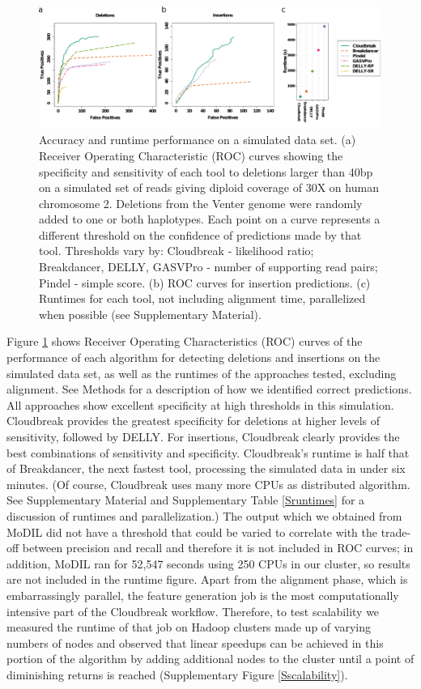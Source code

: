 \documentclass[11pt]{article}
\begin{document}
\begin{figure}
\centering
\includegraphics[width=1\textwidth]{../figures/chr2_sim_rocs_runtime.pdf}
\caption{Accuracy and runtime performance on a simulated data set. (a) Receiver Operating Characteristic (ROC) curves showing the specificity and sensitivity of each tool to deletions larger than 40bp on a simulated set of reads giving diploid coverage of 30X on human chromosome 2. Deletions from the Venter genome were randomly added to one or both haplotypes. Each point on a curve represents a different threshold on the confidence of predictions made by that tool. Thresholds vary by: Cloudbreak - likelihood ratio; Breakdancer, DELLY, GASVPro - number of supporting read pairs; Pindel - simple score. (b) ROC curves for insertion predictions. (c) Runtimes for each tool, not including alignment time, parallelized when possible (see Supplementary Material).}
\label{chr2CombinedRoc}
\end{figure}

Figure \ref{chr2CombinedRoc} shows Receiver Operating Characteristics (ROC) curves of the performance of each algorithm for detecting deletions and insertions on the simulated data set, as well as the runtimes of the approaches tested, excluding alignment. See Methods for a description of how we identified correct predictions. All approaches show excellent specificity at high thresholds in this simulation. Cloudbreak provides the greatest specificity for deletions at higher levels of sensitivity, followed by DELLY. For insertions, Cloudbreak clearly provides the best combinations of sensitivity and specificity. Cloudbreak's runtime is half that of Breakdancer, the next fastest tool, processing the simulated data in under six minutes. (Of course, Cloudbreak uses many more CPUs as distributed algorithm. See Supplementary Material and Supplementary Table \ref{Sruntimes} for a discussion of runtimes and parallelization.) The output which we obtained from MoDIL did not have a threshold that could be varied to correlate with the trade-off between precision and recall and therefore it is not included in ROC curves; in addition, MoDIL ran for 52,547 seconds using 250 CPUs in our cluster, so results are not included in the runtime figure. Apart from the alignment phase, which is embarrassingly parallel, the feature generation job is the most computationally intensive part of the Cloudbreak workflow. Therefore, to test scalability we measured the runtime of that job on Hadoop clusters made up of varying numbers of nodes and observed that linear speedups can be achieved in this portion of the algorithm by adding additional nodes to the cluster until a point of diminishing returns is reached (Supplementary Figure \ref{Sscalability}).
\end{document}
